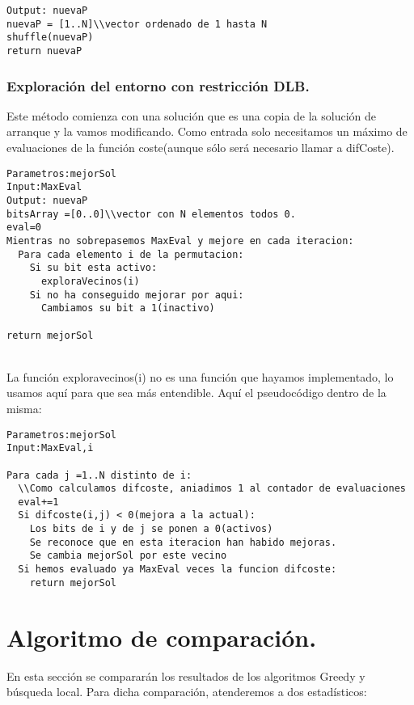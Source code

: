 \hline
\begin{lstlisting}
Output: nuevaP
nuevaP = [1..N]\\vector ordenado de 1 hasta N
shuffle(nuevaP)
return nuevaP
\end{lstlisting}
\hline

\subsubsection{Exploración del entorno con restricción DLB.}
Este método comienza con una solución que es una copia de la solución de arranque y la vamos modificando. Como entrada solo necesitamos un máximo de evaluaciones de la función coste(aunque sólo será necesario llamar a difCoste). \\
\hline
\begin{lstlisting}
Parametros:mejorSol
Input:MaxEval
Output: nuevaP
bitsArray =[0..0]\\vector con N elementos todos 0.
eval=0
Mientras no sobrepasemos MaxEval y mejore en cada iteracion:
  Para cada elemento i de la permutacion:
    Si su bit esta activo:
      exploraVecinos(i)
    Si no ha conseguido mejorar por aqui:
	  Cambiamos su bit a 1(inactivo)
      
return mejorSol
\end{lstlisting}
\hline\\


La función exploravecinos(i) no es una función que hayamos implementado, lo usamos aquí para que sea más entendible. Aquí el pseudocódigo dentro de la misma:\\

\hline
\begin{lstlisting}
Parametros:mejorSol
Input:MaxEval,i

Para cada j =1..N distinto de i:
  \\Como calculamos difcoste, aniadimos 1 al contador de evaluaciones
  eval+=1
  Si difcoste(i,j) < 0(mejora a la actual):
    Los bits de i y de j se ponen a 0(activos)
    Se reconoce que en esta iteracion han habido mejoras.
    Se cambia mejorSol por este vecino
  Si hemos evaluado ya MaxEval veces la funcion difcoste:
    return mejorSol
\end{lstlisting}
\hline



\newpage

\section{Algoritmo de comparación.}
En esta sección se compararán los resultados de los algoritmos Greedy y búsqueda local. Para dicha comparación, atenderemos a dos estadísticos:\\

